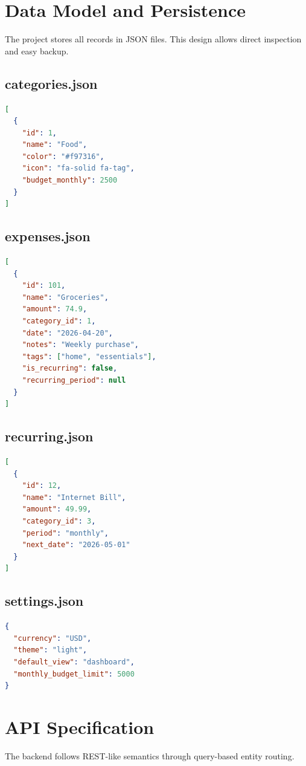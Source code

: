 \documentclass[conference]{IEEEtran}
\begin{document}
\section{Data Model and Persistence}
The project stores all records in JSON files. This design allows direct inspection and easy backup.

\subsection{categories.json}
\begin{lstlisting}[language=json,caption={Category JSON Record}]
[
  {
    "id": 1,
    "name": "Food",
    "color": "#f97316",
    "icon": "fa-solid fa-tag",
    "budget_monthly": 2500
  }
]
\end{lstlisting}

\subsection{expenses.json}
\begin{lstlisting}[language=json,caption={Expense JSON Record}]
[
  {
    "id": 101,
    "name": "Groceries",
    "amount": 74.9,
    "category_id": 1,
    "date": "2026-04-20",
    "notes": "Weekly purchase",
    "tags": ["home", "essentials"],
    "is_recurring": false,
    "recurring_period": null
  }
]
\end{lstlisting}

\subsection{recurring.json}
\begin{lstlisting}[language=json,caption={Recurring JSON Record}]
[
  {
    "id": 12,
    "name": "Internet Bill",
    "amount": 49.99,
    "category_id": 3,
    "period": "monthly",
    "next_date": "2026-05-01"
  }
]
\end{lstlisting}

\subsection{settings.json}
\begin{lstlisting}[language=json,caption={Settings JSON Record}]
{
  "currency": "USD",
  "theme": "light",
  "default_view": "dashboard",
  "monthly_budget_limit": 5000
}
\end{lstlisting}

\section{API Specification}
The backend follows REST-like semantics through query-based entity routing.
\end{document}
